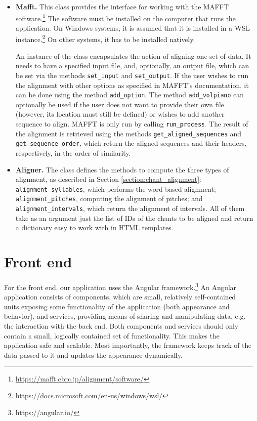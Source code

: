 \begin{itemize}
\item\textbf{Mafft.} This class provides the interface for working with the MAFFT software.\footnote{\url{https://mafft.cbrc.jp/alignment/software/}} The software must be installed
on the computer that runs the application. On Windows systems, it is assumed that it is installed in a WSL instance.\footnote{\url{https://docs.microsoft.com/en-us/windows/wsl/}}
On other systems, it has to be installed natively.

An instance of the class encapsulates the action of aligning one set of data. It needs to have a specified input file, and, optionally, an output file, which can be set
via the methods \verb|set_input| and \verb|set_output|. If the user wishes to run the alignment with other options as specified in MAFFT's documentation, it can be done
using the method \verb|add_option|. The method \verb|add_volpiano| can optionally be used if the user does not want to provide their own file (however, its location must
still be defined) or wishes to add another sequence to align. MAFFT is only run by calling \verb|run_process|. The result of the alignment is retrieved using the methods
\verb|get_aligned_sequences| and \verb|get_sequence_order|, which return the aligned sequences and their headers, respectively, in the order of similarity.

\item\textbf{Aligner.} The class defines the methods to compute the three types of alignment, as described in Section \ref{section:chant_alignment}: \verb|alignment_syllables|,
which performs the word-based alignment; \verb|alignment_pitches|, computing the alignment of pitches; and \verb|alignment_intervals|, which return the alignment of 
intervals. All of them take as an argument just the list of IDs of the chants to be aligned and return a dictionary easy to work with in HTML templates.

\end{itemize}

\section{Front end}

For the front end, our application uses the Angular framework.\footnote{https://angular.io/} An Angular application
consists of components, which are small, relatively self-contained units exposing some functionality of the application (both appearance and behavior), and
services, providing means of sharing and manipulating data, e.g. the interaction with the back end. Both components and services should only contain
a small, logically contained set of functionality. This makes the application safe and scalable. Most importantly, the framework keeps track of the data
passed to it and updates the appearance dynamically.

